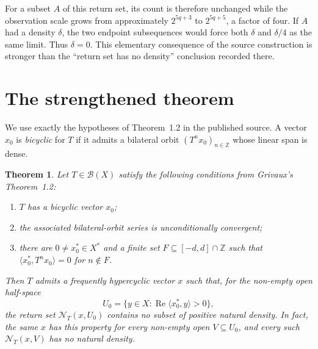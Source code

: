 \documentclass[10pt]{article}
\newtheorem{theorem}{Theorem}
\newcommand{\B}{\mathcal B}
\newcommand{\NT}{\mathcal N_T}
\begin{document}
For a subset $A$ of this return set, its count is therefore unchanged while
the observation scale grows from approximately $2^{5q+3}$ to
$2^{5q+5}$, a factor of four.  If $A$ had a density $\delta$, the two endpoint
subsequences would force both $\delta$ and $\delta/4$ as the same limit.
Thus $\delta=0$.  This elementary consequence of the source construction is
stronger than the ``return set has no density'' conclusion recorded there.

\section{The strengthened theorem}

We use exactly the hypotheses of Theorem~1.2 in the published source.  A
vector $x_0$ is \emph{bicyclic} for $T$ if it admits a bilateral orbit
$(T^nx_0)_{n\in\mathbb Z}$ whose linear span is dense.

\begin{theorem}\label{thm:main}
Let $T\in\B(X)$ satisfy the following conditions from Grivaux's
Theorem~1.2:
\begin{enumerate}
 \item $T$ has a bicyclic vector $x_0$;
 \item the associated bilateral-orbit series is unconditionally convergent;
 \item there are $0\ne x_0^*\in X^*$ and a finite set
 $F\subseteq[-d,d]\cap\mathbb Z$ such that
 $\langle x_0^*,T^nx_0\rangle=0$ for $n\notin F$.
\end{enumerate}
Then $T$ admits a frequently hypercyclic vector $x$ such that, for the
non-empty open half-space
\[
 U_0=\{y\in X:\operatorname{Re}\langle x_0^*,y\rangle>0\},
\]
the return set $\NT(x,U_0)$ contains no subset of positive natural density.
In fact, the same $x$ has this property for every non-empty open
$V\subseteq U_0$, and every such $\NT(x,V)$ has no natural density.
\end{theorem}
\end{document}
